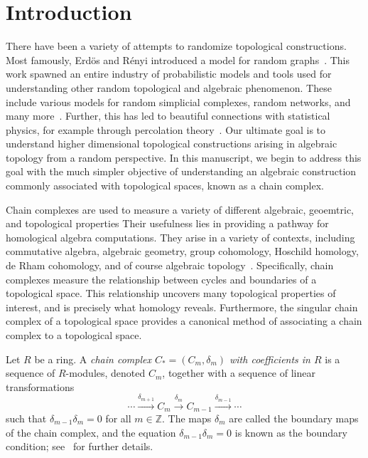 \documentclass[3p,times]{elsarticle}
\theoremstyle{remark}
\newcommand{\Z}{\mathbb{Z}}
\begin{document}


\section{Introduction}

There have been a variety of attempts to randomize topological constructions.
Most famously, Erd\"os and R\'enyi introduced a model for random
graphs~\cite{erdos_random_1959}.  This work spawned an
entire industry of probabilistic models and tools used for understanding other
random topological and algebraic phenomenon. These include various models for
random simplicial complexes, random networks, and many
more~\cite{erdos_evolution_1960, linial_random_2017}. Further, this has
led to beautiful connections with statistical physics, for example through
percolation theory~\cite{bollobas_2006_percolation, broadbent_percolation_1957,
kesten_percolation_1982}.  Our ultimate goal is to understand higher
dimensional topological constructions arising in algebraic topology from a
random perspective. In this manuscript, we begin to address this goal with the
much simpler objective of understanding an algebraic construction commonly associated
with topological spaces, known as a chain complex. 

Chain complexes are used to measure a
variety of different algebraic, geoemtric, and topological properties Their usefulness lies in
providing a pathway for homological algebra computations. They arise in a
variety of contexts, including commutative algebra, algebraic geometry, group
cohomology, Hoschild homology, de Rham cohomology, and of course algebraic
topology~\cite{bott2013differential, brown2012cohomology,
hartshorne2013algebraic, hatcher2002algebraic, hochschild1945cohomology}.
Specifically, chain complexes measure the relationship between cycles and
boundaries of a topological space. This relationship uncovers many topological
properties of interest, and is precisely what homology reveals. Furthermore,
the singular chain complex of a topological space provides a canonical method
of associating a chain complex to a topological space.

Let $R$ be a ring. A {\em chain complex $C_*=(C_m, \delta_m)$ with coefficients in
$R$} is a sequence of $R$-modules, denoted $C_m$, together with a sequence of
linear transformations 
\[
  \cdots \xrightarrow{\delta_{m+1}} C_m \xrightarrow{\delta_m}
  C_{m-1} \xrightarrow{\delta_{m-1}} \cdots
\]
such that $\delta_{m-1}\delta_m = 0$ for all $m \in \Z$.  The maps $\delta_m$
are called the boundary maps of the chain complex, and the equation
$\delta_{m-1} \delta_m = 0$ is known as the boundary condition;
see~\cite{cartan2016homological} for further details. 
\end{document}
